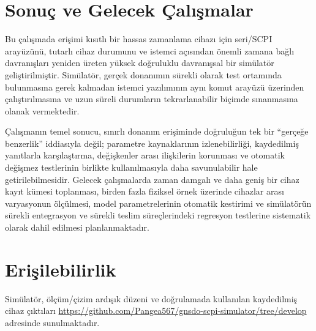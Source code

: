 \documentclass[9pt,twocolumn,a4paper]{extarticle}
\begin{document}
\balance
\section{Sonuç ve Gelecek Çalışmalar}
Bu çalışmada erişimi kısıtlı bir hassas zamanlama cihazı için seri/SCPI arayüzünü, tutarlı cihaz durumunu ve istemci açısından önemli zamana bağlı davranışları yeniden üreten yüksek doğruluklu davranışsal bir simülatör geliştirilmiştir. Simülatör, gerçek donanımın sürekli olarak test ortamında bulunmasına gerek kalmadan istemci yazılımının aynı komut arayüzü üzerinden çalıştırılmasına ve uzun süreli durumların tekrarlanabilir biçimde sınanmasına olanak vermektedir.

Çalışmanın temel sonucu, sınırlı donanım erişiminde doğruluğun tek bir ``gerçeğe benzerlik'' iddiasıyla değil; parametre kaynaklarının izlenebilirliği, kaydedilmiş yanıtlarla karşılaştırma, değişkenler arası ilişkilerin korunması ve otomatik değişmez testlerinin birlikte kullanılmasıyla daha savunulabilir hale getirilebilmesidir. Gelecek çalışmalarda zaman damgalı ve daha geniş bir cihaz kayıt kümesi toplanması, birden fazla fiziksel örnek üzerinde cihazlar arası varyasyonun ölçülmesi, model parametrelerinin otomatik kestirimi ve simülatörün sürekli entegrasyon ve sürekli teslim süreçlerindeki regresyon testlerine sistematik olarak dahil edilmesi planlanmaktadır.

\section{Erişilebilirlik}
Simülatör, ölçüm/çizim ardışık düzeni ve doğrulamada kullanılan kaydedilmiş cihaz çıktıları \url{https://github.com/Pangea567/gnsdo-scpi-simulator/tree/develop} adresinde sunulmaktadır.
\end{document}
